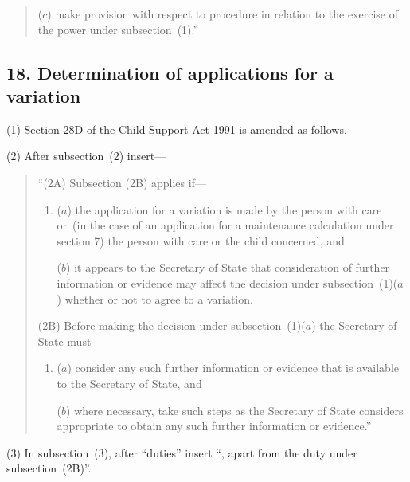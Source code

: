 \documentclass[12pt,a4paper]{article}
\begin{document}
{\begin{quotation}
\begin{enumerate}
($c$) make provision with respect to procedure in relation to the exercise of the power under subsection~(1).”
\end{enumerate}
\end{quotation}


\subsection{18. Determination of applications for a variation}

(1) Section 28D of the Child Support Act 1991 is amended as follows.

(2) After subsection~(2) insert—
\begin{quotation}
“(2A) Subsection (2B) applies if—
\begin{enumerate}\item[]
($a$) the application for a variation is made by the person with care or~(in the case of an application for a maintenance calculation under section 7) the person with care or the child concerned, and

($b$) it appears to the Secretary of State that consideration of further information or evidence may affect the decision under subsection~(1)($a$) whether or not to agree to a variation.
\end{enumerate}

(2B) Before making the decision under subsection~(1)($a$) the Secretary of State must—
\begin{enumerate}\item[]
($a$) consider any such further information or evidence that is available to the Secretary of State, and

($b$) where necessary, take such steps as the Secretary of State considers appropriate to obtain any such further information or evidence.”
\end{enumerate}
\end{quotation}

(3) In subsection~(3), after “duties” insert “, apart from the duty under subsection~(2B)”.

}
\end{document}
